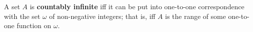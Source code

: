 A set $A$ is \textbf{countably infinite} iff it can be put into one-to-one correspondence with the set $\omega$ of non-negative integers; that is, iff $A$ is the range of some one-to-one function on $\omega$.
